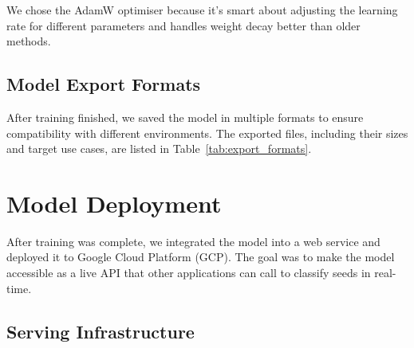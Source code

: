 We chose the AdamW optimiser because it's smart about adjusting the learning rate for different parameters and handles weight decay better than older methods.

\subsection{Model Export Formats}

After training finished, we saved the model in multiple formats to ensure compatibility with different environments. The exported files, including their sizes and target use cases, are listed in Table~\ref{tab:export_formats}.

\begin{table}[htbp]
\centering
\caption{Model Export Formats}
\label{tab:export_formats}
\end{table}

\section{Model Deployment}

After training was complete, we integrated the model into a web service and deployed it to Google Cloud Platform (GCP). The goal was to make the model accessible as a live API that other applications can call to classify seeds in real-time.

\subsection{Serving Infrastructure}


